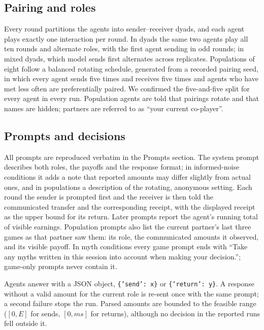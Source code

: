 \subsection{Pairing and roles}
\label{sec:protocol-pairing}

Every round partitions the agents into sender--receiver dyads, and each agent plays exactly one interaction per round. In dyads the same two agents play all ten rounds and alternate roles, with the first agent sending in odd rounds; in mixed dyads, which model sends first alternates across replicates. Populations of eight follow a balanced rotating schedule, generated from a recorded pairing seed, in which every agent sends five times and receives five times and agents who have met less often are preferentially paired. We confirmed the five-and-five split for every agent in every run. Population agents are told that pairings rotate and that names are hidden; partners are referred to as ``your current co-player''.

\subsection{Prompts and decisions}
\label{sec:protocol-prompts}

All prompts are reproduced verbatim in the Prompts section. The system prompt describes both roles, the payoffs and the response format; in informed-noise conditions it adds a note that reported amounts may differ slightly from actual ones, and in populations a description of the rotating, anonymous setting. Each round the sender is prompted first and the receiver is then told the communicated transfer and the corresponding receipt, with the displayed receipt as the upper bound for its return. Later prompts report the agent's running total of visible earnings. Population prompts also list the current partner's last three games as that partner saw them: its role, the communicated amounts it observed, and its visible payoff. In myth conditions every game prompt ends with ``Take any myths written in this session into account when making your decision.''; game-only prompts never contain it.

Agents answer with a JSON object, \texttt{\{'send': x\}} or \texttt{\{'return': y\}}. A response without a valid amount for the current role is re-sent once with the same prompt; a second failure stops the run. Parsed amounts are bounded to the feasible range ($[0,E]$ for sends, $[0,ms]$ for returns), although no decision in the reported runs fell outside it.

